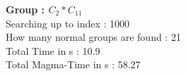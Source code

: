 \textbf{Group : $C_2*C_{11}$}\\
Searching up to index : 1000\\
How many normal groups are found : 21\\
Total Time in s : 10.9\\
Total Magma-Time in s : 58.27\\
